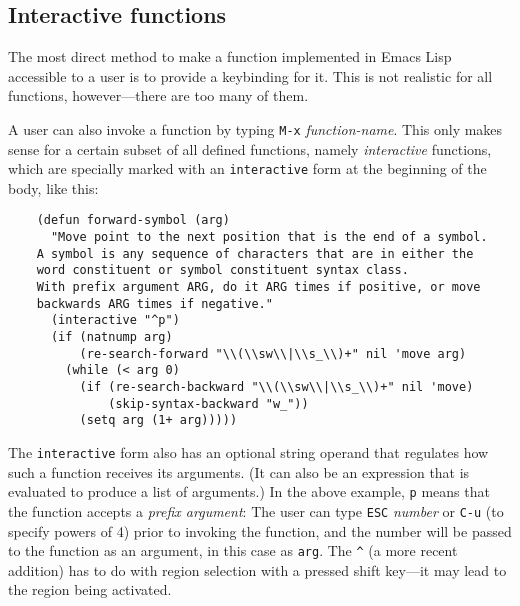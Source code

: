 \documentclass[format=acmsmall, review]{acmart}
\newcommand \Elisp {Emacs Lisp}
\begin{document}
\subsection{Interactive functions}
\label{sec:interactive-functions}

The most direct method to make a function implemented in \Elisp{}
accessible to a user is to provide a keybinding for it.  This is not
realistic for all functions, however---there are too many of them.

A user can also invoke a function by typing \texttt{M-x}
\emph{function-name}.  This only makes sense for a certain subset of
all defined functions, namely \emph{interactive} functions, which
are specially marked with an \texttt{interactive} form at the
beginning of the body, like this:
\begin{verbatim}
    (defun forward-symbol (arg)
      "Move point to the next position that is the end of a symbol.
    A symbol is any sequence of characters that are in either the
    word constituent or symbol constituent syntax class.
    With prefix argument ARG, do it ARG times if positive, or move
    backwards ARG times if negative."
      (interactive "^p")
      (if (natnump arg)
          (re-search-forward "\\(\\sw\\|\\s_\\)+" nil 'move arg)
        (while (< arg 0)
          (if (re-search-backward "\\(\\sw\\|\\s_\\)+" nil 'move)
              (skip-syntax-backward "w_"))
          (setq arg (1+ arg)))))
\end{verbatim}
The \texttt{interactive} form also has an optional string operand that
regulates how such a function receives its arguments.  (It can also be
an expression that is evaluated to produce a list of arguments.)  In the above
example, \verb|p| means that the function accepts a \emph{prefix
  argument}: The user can type \texttt{ESC} \emph{number} or
\texttt{C-u} (to specify powers of 4) prior to invoking the function,
and the number will be passed to the function as an argument, in this
case as \texttt{arg}.  The \verb|^| (a more recent addition) has to do with
region selection with a pressed shift key---it may lead to the region
being activated.
\end{document}
